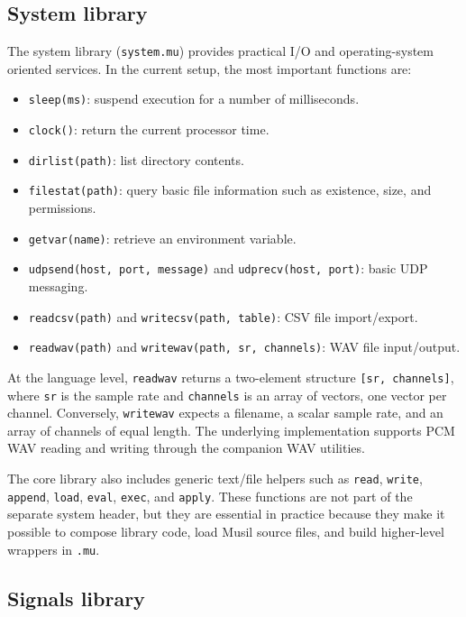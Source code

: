 \documentclass[11pt,a4paper]{article}
\newcommand{\musil}[1]{\lstinline[style=musilinline]{#1}}
\begin{document}
\subsection{System library}

The system library (\musil{system.mu}) provides practical I/O and operating-system oriented services. In the current setup, the most important functions are:
\begin{itemize}
    \item \texttt{sleep(ms)}: suspend execution for a number of milliseconds.
    \item \texttt{clock()}: return the current processor time.
    \item \texttt{dirlist(path)}: list directory contents.
    \item \texttt{filestat(path)}: query basic file information such as existence, size, and permissions.
    \item \texttt{getvar(name)}: retrieve an environment variable.
    \item \texttt{udpsend(host, port, message)} and \texttt{udprecv(host, port)}: basic UDP messaging.
    \item \texttt{readcsv(path)} and \texttt{writecsv(path, table)}: CSV file import/export.
    \item \texttt{readwav(path)} and \texttt{writewav(path, sr, channels)}: WAV file input/output.
\end{itemize}

At the language level, \texttt{readwav} returns a two-element structure \texttt{[sr, channels]}, where \texttt{sr} is the sample rate and \texttt{channels} is an array of vectors, one vector per channel. Conversely, \texttt{writewav} expects a filename, a scalar sample rate, and an array of channels of equal length. The underlying implementation supports PCM WAV reading and writing through the companion WAV utilities. 

The core library also includes generic text/file helpers such as \texttt{read}, \texttt{write}, \texttt{append}, \texttt{load}, \texttt{eval}, \texttt{exec}, and \texttt{apply}. These functions are not part of the separate system header, but they are essential in practice because they make it possible to compose library code, load Musil source files, and build higher-level wrappers in \texttt{.mu}. 

\subsection{Signals library}
\end{document}

